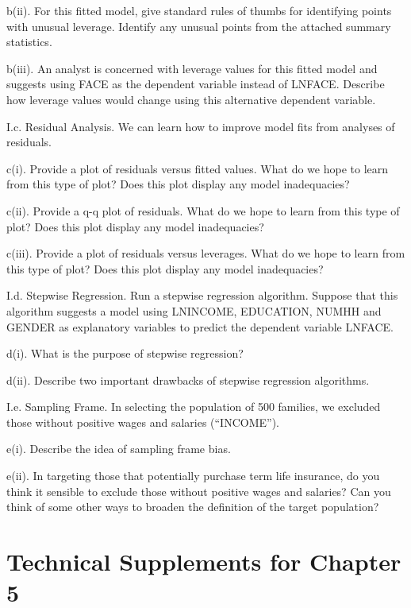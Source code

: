 \begin{exercises}
b(ii). For this fitted model, give standard rules of thumbs for
identifying points with unusual leverage. Identify any unusual
points from the attached summary statistics.

b(iii). An analyst is concerned with leverage values for this fitted
model and suggests using FACE as the dependent variable instead of
LNFACE. Describe how leverage values would change using this
alternative dependent variable.


I.c. Residual Analysis. We can learn how to improve model fits from
analyses of residuals.

c(i). Provide a plot of residuals versus fitted values. What do we
hope to learn from this type of plot? Does this plot display any
model inadequacies?

c(ii). Provide a q-q plot of residuals. What do we hope to learn
from this type of plot? Does this plot display any model
inadequacies?

c(iii). Provide a plot of residuals versus leverages. What do we
hope to learn from this type of plot? Does this plot display any
model inadequacies?


I.d. Stepwise Regression. Run a stepwise regression algorithm.
Suppose that this algorithm suggests a model using LNINCOME,
EDUCATION, NUMHH and GENDER as explanatory variables to predict the
dependent variable LNFACE.

d(i). What is the purpose of stepwise regression?

d(ii). Describe two important drawbacks of stepwise regression
algorithms.

I.e. Sampling Frame. In selecting the population of 500 families, we
excluded those without positive wages and salaries (``INCOME'').

e(i). Describe the idea of sampling frame bias.

e(ii). In targeting those that potentially purchase term life
insurance, do you think it sensible to exclude those without
positive wages and salaries? Can you think of some other ways to
broaden the definition of the target population?


\end{exercises}



\bigskip

\bigskip
\setcounter{equation}{13}
\section{Technical Supplements for Chapter 5}\label{S5:TechSupps}

